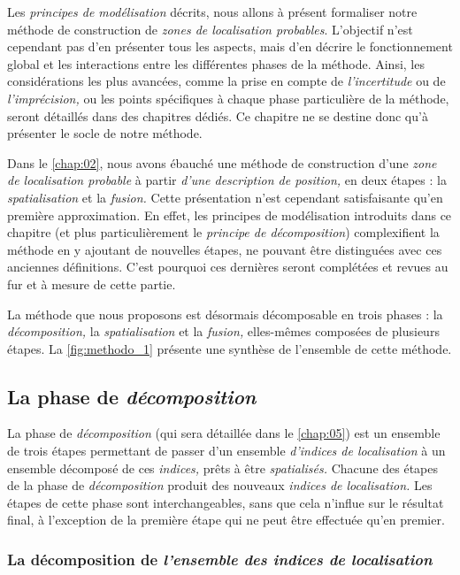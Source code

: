 Les \emph{principes de modélisation} décrits, nous allons à présent
formaliser notre méthode de construction de \emph{zones de
  localisation probables}. L'objectif n'est cependant pas d'en
présenter tous les aspects, mais d'en décrire le fonctionnement global
et les interactions entre les différentes phases de la méthode. Ainsi,
les considérations les plus avancées, comme la prise en compte de
\emph{l'incertitude} ou de \emph{l'imprécision,} ou les points
spécifiques à chaque phase particulière de la méthode, seront
détaillés dans des chapitres dédiés. Ce chapitre ne se destine donc
qu'à présenter le socle de notre méthode.

Dans le \autoref{chap:02}, nous avons ébauché une méthode de
construction d'une \emph{zone de localisation probable} à partir
\emph{d'une description de position,} en deux étapes : la
\emph{spatialisation} et la \emph{fusion.} Cette présentation n'est
cependant satisfaisante qu'en première approximation. En effet, les
principes de modélisation introduits dans ce chapitre (et plus
particulièrement le \emph{principe de décomposition}) complexifient la
méthode en y ajoutant de nouvelles étapes, ne pouvant être distinguées
avec ces anciennes définitions. C'est pourquoi ces dernières seront
complétées et revues au fur et à mesure de cette partie.

La méthode que nous proposons est désormais décomposable en trois
phases : la \emph{décomposition,} la \emph{spatialisation} et la
\emph{fusion,} elles-mêmes composées de plusieurs étapes. La
\autoref{fig:methodo_1} présente une synthèse de l'ensemble de cette
méthode.

\subsection{La phase de \emph{décomposition}}

La phase de \emph{décomposition} (qui sera détaillée dans le
\autoref{chap:05}) est un ensemble de trois étapes permettant de
passer d'un ensemble \emph{d'indices de localisation} à un ensemble
décomposé de ces \emph{indices,} prêts à être \emph{spatialisés.}
Chacune des étapes de la phase de \emph{décomposition} produit des
nouveaux \emph{indices de localisation.} Les étapes de cette phase
sont interchangeables, sans que cela n'influe sur le résultat final, à
l'exception de la première étape qui ne peut être effectuée qu'en
premier.

\subsubsection{La décomposition de \emph{l'ensemble des indices de
    localisation}}

